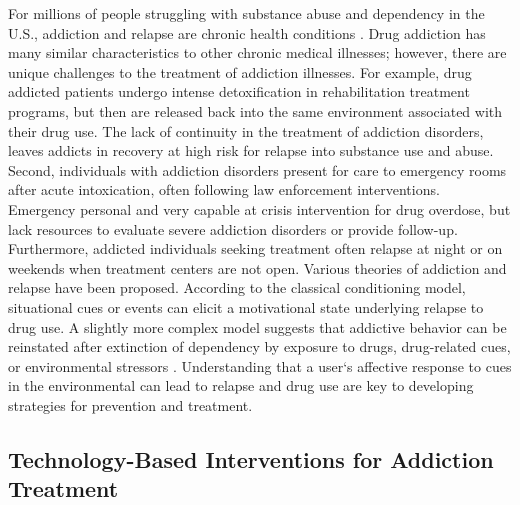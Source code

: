 \documentclass[sigconf]{acmart}
\begin{document}
For millions of people struggling with substance abuse and dependency in 
the U.S., addiction and relapse are chronic health conditions \cite{boyer10}. 
Drug addiction has many similar characteristics to other chronic medical 
illnesses; however, there are unique challenges to the treatment of addiction
illnesses. For example, drug addicted patients undergo intense detoxification 
in rehabilitation treatment programs, but then are released back into the same 
environment associated with their drug use. The lack of continuity in the 
treatment of addiction disorders, leaves addicts in recovery at high risk for
relapse into substance use and abuse. Second, individuals with addiction 
disorders present for care to emergency rooms after acute intoxication, often 
following law enforcement interventions. Emergency personal and very capable 
at crisis intervention for drug overdose, but lack resources to evaluate severe 
addiction disorders or provide follow-up. Furthermore, addicted individuals 
seeking treatment often relapse at night or on weekends when treatment centers 
are not open. Various theories of addiction and relapse have been proposed. 
According to the classical conditioning model, situational cues or events can 
elicit a motivational state underlying relapse to drug use. A slightly more 
complex model suggests that addictive behavior can be reinstated after 
extinction of dependency by exposure to drugs, drug-related cues, or 
environmental stressors \cite{shaham03}. Understanding that a user`s affective
response to cues in the environmental can lead to relapse and drug use are key 
to developing strategies for prevention and treatment. 


\subsection{Technology-Based Interventions for Addiction Treatment}
\end{document}
